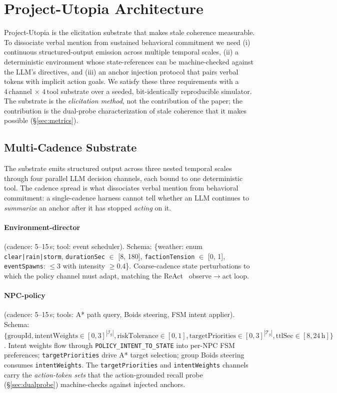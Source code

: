 \section{Project-Utopia Architecture}
\label{sec:architecture}

Project-Utopia is the elicitation substrate that makes stale coherence
measurable. To dissociate verbal mention from sustained behavioral
commitment we need (i) continuous structured-output emission across
multiple temporal scales, (ii) a deterministic environment whose
state-references can be machine-checked against the LLM's directives,
and (iii) an anchor injection protocol that pairs verbal tokens with
implicit action goals. We satisfy these three requirements with a
$4\,\text{channel}\,\times\,4\,\text{tool}$ substrate over a seeded,
bit-identically reproducible simulator. The substrate is the
\emph{elicitation method}, not the contribution of the paper; the
contribution is the dual-probe characterization of stale coherence
that it makes possible (\S\ref{sec:metrics}).

\subsection{Multi-Cadence Substrate}
\label{sec:channels}

The substrate emits structured output across three nested temporal
scales through four parallel LLM decision channels, each bound to one
deterministic tool. The cadence spread is what dissociates verbal
mention from behavioral commitment: a single-cadence harness cannot
tell whether an LLM continues to \emph{summarize} an anchor after it
has stopped \emph{acting} on it.

\paragraph{Environment-director} (cadence: 5--15\,s; tool: event
scheduler). Schema: \{weather: enum \texttt{clear|rain|storm},
\texttt{durationSec} $\in$ [8, 180], \texttt{factionTension} $\in$
[0, 1], \texttt{eventSpawns}: $\leq$3 with intensity $\geq 0.4$\}.
Coarse-cadence state perturbations to which the policy channel must
adapt, matching the ReAct~\citep{Yao2023ReAct} observe$\to$act loop.

\paragraph{NPC-policy} (cadence: 5--15\,s; tools: A* path query,
Boids steering, FSM intent applier). Schema: $\{\text{groupId},
\text{intentWeights} \in [0,3]^{|\mathcal{I}_g|},
\text{riskTolerance} \in [0,1],
\text{targetPriorities} \in [0,3]^{|\mathcal{T}_g|},
\text{ttlSec} \in [8, 24\,\text{h}]\}$. Intent weights flow through
\texttt{POLICY\_INTENT\_TO\_STATE} into per-NPC FSM preferences;
\texttt{targetPriorities} drive A* target selection; group Boids
steering consumes \texttt{intentWeights}. The
\texttt{targetPriorities} and \texttt{intentWeights} channels carry
the \emph{action-token sets} that the action-grounded recall probe
(\S\ref{sec:dualprobe}) machine-checks against injected anchors.

